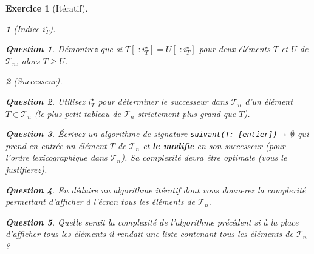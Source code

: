 \documentclass{article}
\theoremstyle{exostyle}
\newtheorem{exo}{Exercice}
\theoremstyle{partiestyle}
\newtheorem{partie}{}[exo]
\theoremstyle{questionstyle}
\newtheorem{questionpartie}{Question}[partie]
\begin{document}
\begin{exo}[Itératif]
\begin{partie}[Indice $i^\star_{T}$]
        \begin{questionpartie}
            Démontrez que si $T[\;:i^\star_{T}] = U[\;:i^\star_{T}]$ pour deux éléments $T$ et $U$ de $\mathcal{T}_n$, alors $T \geq U$.
        \end{questionpartie}
    \end{partie}
    \begin{partie}[Successeur]
        \begin{questionpartie}
            Utilisez $i^\star_{T}$ pour déterminer le successeur dans $\mathcal{T}_n$ d'un élément $T \in \mathcal{T}_n$ (le plus petit tableau de $\mathcal{T}_n$ strictement plus grand que $T$).
        \end{questionpartie}
        \begin{questionpartie}
            Écrivez un algorithme de signature \verb|suivant(T: [entier]) → |$\emptyset$  qui prend en entrée un élément $T$ de $\mathcal{T}_n$ et {\bf le modifie} en son successeur (pour l'ordre lexicographique dans $\mathcal{T}_n$). Sa complexité devra être optimale (vous le justifierez).
        \end{questionpartie}
        \begin{questionpartie}
            En déduire un algorithme itératif dont vous donnerez la complexité permettant d'afficher à l'écran tous les éléments de $\mathcal{T}_n$.
        \end{questionpartie}
        \begin{questionpartie}
            Quelle serait la complexité de l'algorithme précédent si à la place d'afficher tous les éléments il rendait une liste contenant tous les éléments de $\mathcal{T}_n$ ?
        \end{questionpartie}

    \end{partie}
\end{exo}
\end{document}
